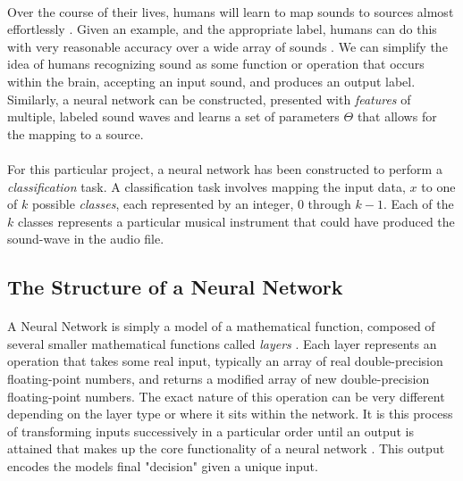 \documentclass[12pt,letterpaper]{article}
\begin{document}
\paragraph*{}Over the course of their lives, humans will learn to map sounds to sources almost effortlessly \cite{Virtanen}. Given an example, and the appropriate label, humans can do this with very reasonable accuracy over a wide array of sounds \cite{Olsen,White}. We can simplify the idea of humans recognizing sound as some function or operation that occurs within the brain, accepting an input sound, and produces an output label. Similarly, a neural network can be constructed, presented with \textit{features} of multiple, labeled sound waves and learns a set of parameters $\Theta$ that allows for the mapping to a source.

\paragraph*{}For this particular project, a neural network has been constructed to perform a \textit{classification} task. A classification task involves mapping the input data, $x$ to one of $k$ possible \textit{classes}, each represented by an integer, $0$ through $k-1$. Each of the $k$ classes represents a particular musical instrument that could have produced the sound-wave in the audio file. 


\subsection{The Structure of a Neural Network}
\label{subsec-NetworkStructure}

\paragraph*{}A Neural Network is simply a model of a mathematical function, composed of several smaller mathematical functions called \textit{layers} \cite{Goodfellow,Loy}. Each layer represents an operation that takes some real input, typically an array of real double-precision floating-point numbers, and returns a modified array of new double-precision floating-point numbers. The exact nature of this operation can be very different depending on the layer type or where it sits within the network. It is this process of transforming inputs successively in a particular order until an output is attained that makes up the core functionality of a neural network \cite{Geron,Loy}. This output encodes the models final "decision" given a unique input.
\end{document}
